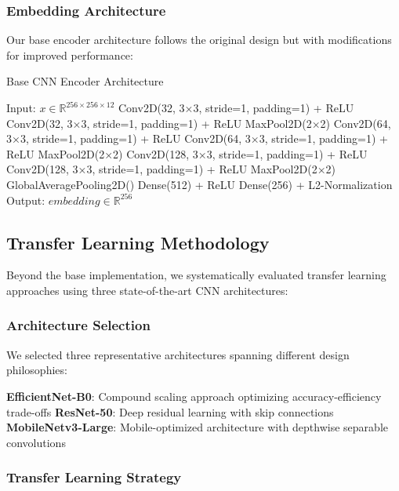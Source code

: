 \subsubsection{Embedding Architecture}

Our base encoder architecture follows the original design but with modifications for improved performance:

\begin{algorithm}
\caption{Base CNN Encoder Architecture}
\begin{algorithmic}
\STATE Input: $x \in \mathbb{R}^{256 \times 256 \times 12}$
\STATE Conv2D(32, 3×3, stride=1, padding=1) + ReLU
\STATE Conv2D(32, 3×3, stride=1, padding=1) + ReLU
\STATE MaxPool2D(2×2)
\STATE Conv2D(64, 3×3, stride=1, padding=1) + ReLU
\STATE Conv2D(64, 3×3, stride=1, padding=1) + ReLU
\STATE MaxPool2D(2×2)
\STATE Conv2D(128, 3×3, stride=1, padding=1) + ReLU
\STATE Conv2D(128, 3×3, stride=1, padding=1) + ReLU
\STATE MaxPool2D(2×2)
\STATE GlobalAveragePooling2D()
\STATE Dense(512) + ReLU
\STATE Dense(256) + L2-Normalization
\STATE Output: $embedding \in \mathbb{R}^{256}$
\end{algorithmic}
\end{algorithm}

\subsection{Transfer Learning Methodology}

Beyond the base implementation, we systematically evaluated transfer learning approaches using three state-of-the-art CNN architectures:

\subsubsection{Architecture Selection}

We selected three representative architectures spanning different design philosophies:

\textbf{EfficientNet-B0}: Compound scaling approach optimizing accuracy-efficiency trade-offs
\textbf{ResNet-50}: Deep residual learning with skip connections
\textbf{MobileNetv3-Large}: Mobile-optimized architecture with depthwise separable convolutions

\subsubsection{Transfer Learning Strategy}

